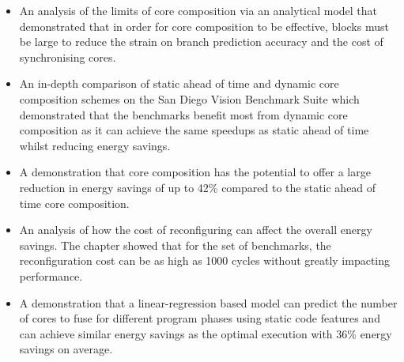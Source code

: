 \begin{itemize}
\item An analysis of the limits of core composition via an analytical model that demonstrated that in order for core composition to be effective, blocks must be large to reduce the strain on branch prediction accuracy and the cost of synchronising cores.
\item An in-depth comparison of static ahead of time and dynamic core composition schemes on the San Diego Vision Benchmark Suite which demonstrated that the benchmarks benefit most from dynamic core composition as it can achieve the same speedups as static ahead of time whilst reducing energy savings.
\item A demonstration that core composition has the potential to offer a large reduction in energy savings of up to 42\% compared to the static ahead of time core composition.
\item An analysis of how the cost of reconfiguring can affect the overall energy savings. The chapter showed that for the set of benchmarks, the reconfiguration cost can be as high as 1000 cycles without greatly impacting performance.
\item A demonstration that a linear-regression based model can predict the number of cores to fuse for different program phases using static code features and can achieve similar energy savings as the optimal execution with 36\% energy savings on average.
\end{itemize} 




